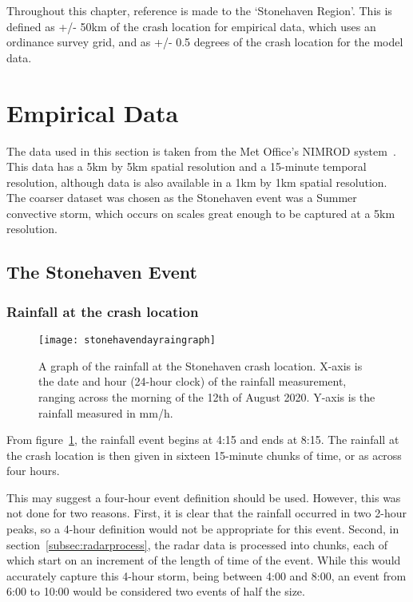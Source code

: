 
Throughout this chapter,
    reference is made to the `Stonehaven Region'.
This is defined as +/- 50km of the crash location for empirical data,
    which uses an ordinance survey grid,
    and as +/- 0.5 degrees of the crash location for the model data.

\section{Empirical Data}\label{sec:def}

The data used in this section is taken from the Met Office's NIMROD system~\cite{radar_data}.
This data has a 5km by 5km spatial resolution and a 15-minute temporal resolution,
    although data is also available in a 1km by 1km spatial resolution.
The coarser dataset was chosen as the Stonehaven event was a Summer convective storm,
    which occurs on scales great enough to be captured at a 5km resolution.

\subsection{The Stonehaven Event}\label{subsec:actualevent}

\subsubsection{Rainfall at the crash location}

\begin{figure}[H]
    \begin{center}
    \texttt{[image: stonehavendayraingraph]}
    \end{center}
    \caption[A graph of the rainfall at the Stonehaven crash location.]{
        A graph of the rainfall at the Stonehaven crash location.
    X-axis is the date and hour (24-hour clock) of the rainfall measurement,
        ranging across the morning of the 12th of August 2020.
    Y-axis is the rainfall measured in mm/h.}
    \label{fig:stonehavendayraingraph}
\end{figure}

From figure~\ref{fig:stonehavendayraingraph},
    the rainfall event begins at 4:15 and ends at 8:15.
The rainfall at the crash location is then given in sixteen 15-minute chunks of time,
    or as across four hours.

This may suggest a four-hour event definition should be used.
However, this was not done for two reasons.
First, it is clear that the rainfall occurred in two 2-hour peaks,
 so a 4-hour definition would not be appropriate for this event.
Second, in section~\ref{subsec:radarprocess},
    the radar data is processed into chunks,
    each of which start on an increment of the length of time of the event.
While this would accurately capture this 4-hour storm, being between 4:00 and 8:00,
    an event from 6:00 to 10:00 would be considered two events of half the size.

